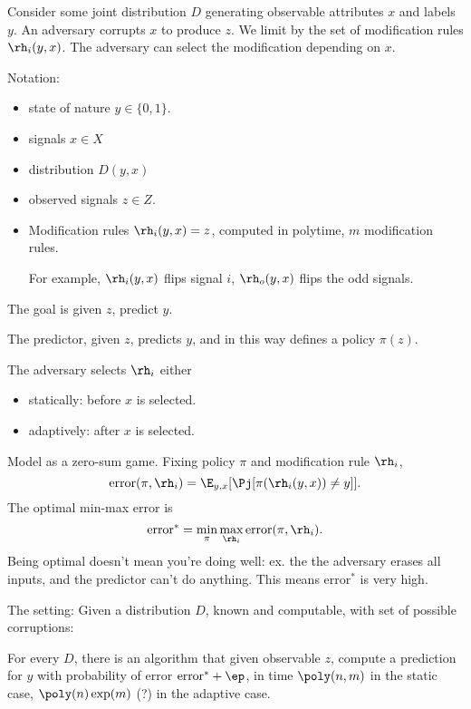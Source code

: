 Consider some joint distribution $D$ generating observable attributes $x$ and labels $y$. An adversary corrupts $x$ to produce $z$. We limit by the set of modification rules $\rh_i(y,x)$. The adversary can select the modification depending on $x$.

Notation:
\begin{itemize}
\item
state of nature $y\in \{0,1\}$.
\item
signals $x\in X$
\item
distribution $D(y,x)$
\item
observed signals $z\in Z$.
\item
Modification rules $\rh_i(y,x)=z$, computed in polytime, $m$ modification rules.

For example, $\rh_i(y,x)$ flips signal $i$, $\rh_o(y,x)$ flips the odd signals.
\end{itemize}
The goal is given $z$, predict $y$.

The predictor, given $z$, predicts $y$, and in this way defines a policy $\pi(z)$.

The adversary selects $\rh_i$ either
\begin{itemize}
\item
statically: before $x$ is selected.
\item
adaptively: after $x$ is selected.
\end{itemize}

Model as a zero-sum game. Fixing policy $\pi$ and modification rule $\rh_i$, 
$$
\text{error}(\pi,\rh_i) = \E_{y,x}[\Pj[\pi(\rh_i(y,x))\ne y]].
$$
The optimal min-max error is
$$
\text{error}^* = \min_\pi\max_{\rh_i} \text{error}(\pi, \rh_i).
$$
Being optimal doesn't mean you're doing well: ex. the the adversary erases all inputs, and the predictor can't do anything. This means $\text{error}^*$ is very high.



The setting:  Given a distribution $D$, known and computable, with set of possible corruptions:

For every $D$, there is an algorithm that given observable $z$, compute a prediction for $y$ with probability of error $\text{error}^*+\ep$, in time $\poly(n,m)$ in the static case, $\poly(n)\exp(m)$ (?) in the adaptive case.

